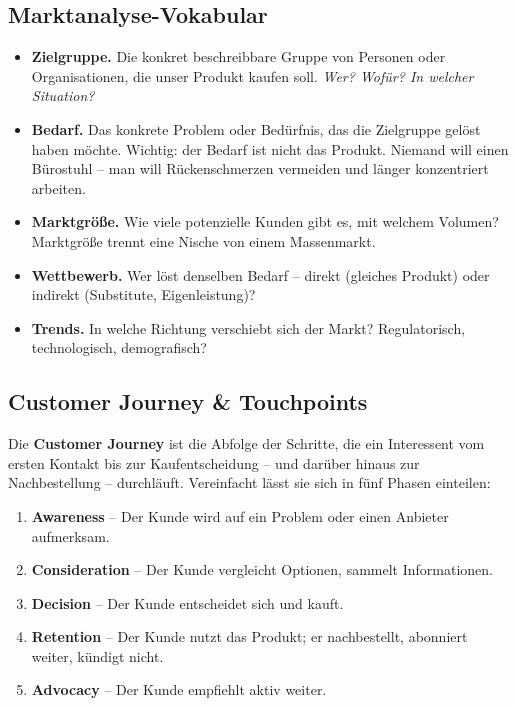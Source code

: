 \documentclass[11pt,a4paper,oneside]{article}
\newcommand{\fachbegriff}[1]{\textbf{#1}}
\begin{document}
\subsection{Marktanalyse-Vokabular}

\begin{itemize}
  \item \fachbegriff{Zielgruppe.} Die konkret beschreibbare Gruppe von Personen oder Organisationen, die unser Produkt kaufen soll. \emph{Wer? Wofür? In welcher Situation?}
  \item \fachbegriff{Bedarf.} Das konkrete Problem oder Bedürfnis, das die Zielgruppe gelöst haben möchte. Wichtig: der Bedarf ist nicht das Produkt. Niemand will einen Bürostuhl -- man will Rückenschmerzen vermeiden und länger konzentriert arbeiten.
  \item \fachbegriff{Marktgröße.} Wie viele potenzielle Kunden gibt es, mit welchem Volumen? Marktgröße trennt eine Nische von einem Massenmarkt.
  \item \fachbegriff{Wettbewerb.} Wer löst denselben Bedarf -- direkt (gleiches Produkt) oder indirekt (Substitute, Eigenleistung)?
  \item \fachbegriff{Trends.} In welche Richtung verschiebt sich der Markt? Regulatorisch, technologisch, demografisch?
\end{itemize}

\subsection{Customer Journey \& Touchpoints}

Die \fachbegriff{Customer Journey} ist die Abfolge der Schritte, die ein Interessent vom ersten Kontakt bis zur Kaufentscheidung -- und darüber hinaus zur Nachbestellung -- durchläuft. Vereinfacht lässt sie sich in fünf Phasen einteilen:

\begin{enumerate}
  \item \fachbegriff{Awareness} -- Der Kunde wird auf ein Problem oder einen Anbieter aufmerksam.
  \item \fachbegriff{Consideration} -- Der Kunde vergleicht Optionen, sammelt Informationen.
  \item \fachbegriff{Decision} -- Der Kunde entscheidet sich und kauft.
  \item \fachbegriff{Retention} -- Der Kunde nutzt das Produkt; er nachbestellt, abonniert weiter, kündigt nicht.
  \item \fachbegriff{Advocacy} -- Der Kunde empfiehlt aktiv weiter.
\end{enumerate}
\end{document}
